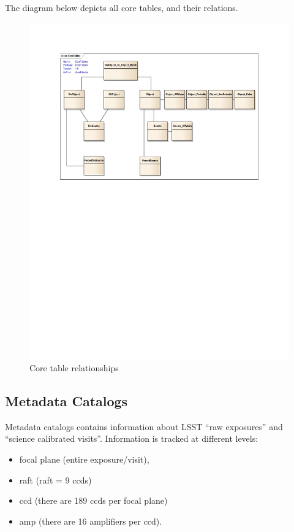 \documentclass[DM,lsstdraft,toc]{lsstdoc}
\begin{document}
The diagram below depicts all core tables, and their relations.

\begin{figure}
  \centering\includegraphics[scale=0.80]{diagrams/coretables}
  \caption{Core table relationships}
\end{figure}

\subsection{Metadata Catalogs}

Metadata catalogs contains information about LSST ``raw exposures'' and ``science calibrated visits''. Information is tracked at different levels:

\begin{itemize}
  \item focal plane (entire exposure/visit),
  \item raft (raft = 9 ccds)
  \item ccd (there are 189 ccds per focal plane)
  \item amp (there are 16 amplifiers per ccd).
\end{itemize}
\end{document}
